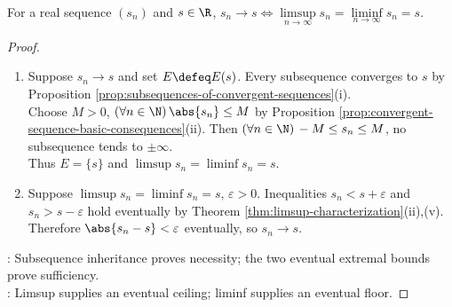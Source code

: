 \begin{theorem} \label{thm:convergence-iff-limsup-liminf-equal} \\
For a real sequence $(s_n)$ and $s\in\R$, $s_n\to s\Longleftrightarrow\limsup\limits_{n\to\infty}s_n=\liminf\limits_{n\to\infty}s_n=s$.
\begin{proof}
\begin{enumerate}[label=\roman*.]
\setlength{\itemsep}{0pt}
\item[$(\Rightarrow)$] Suppose $s_n\to s$ and set $E\defeq E(s)$. Every subsequence converges to $s$ by Proposition \ref{prop:subsequences-of-convergent-sequences}(i).\\
Choose $M>0$, $(\forall n\in\N)\,\abs{s_n}\leq M$ by Proposition \ref{prop:convergent-sequence-basic-consequences}(ii). Then $(\forall n\in\N)\,-M\leq s_n\leq M$, no subsequence tends to $\pm\infty$.\\
Thus $E=\{s\}$ and $\limsup s_n=\liminf s_n=s$.
\item[$(\Leftarrow)$] Suppose $\limsup s_n=\liminf s_n=s$, $\varepsilon>0$. Inequalities $s_n<s+\varepsilon$ and $s_n>s-\varepsilon$ hold eventually by Theorem \ref{thm:limsup-characterization}(ii),(v).\\
Therefore $\abs{s_n-s}<\varepsilon$ eventually, so $s_n\to s$.
\end{enumerate}
: Subsequence inheritance proves necessity; the two eventual extremal bounds prove sufficiency.\\
: Limsup supplies an eventual ceiling; liminf supplies an eventual floor.
\end{proof}
\end{theorem}

